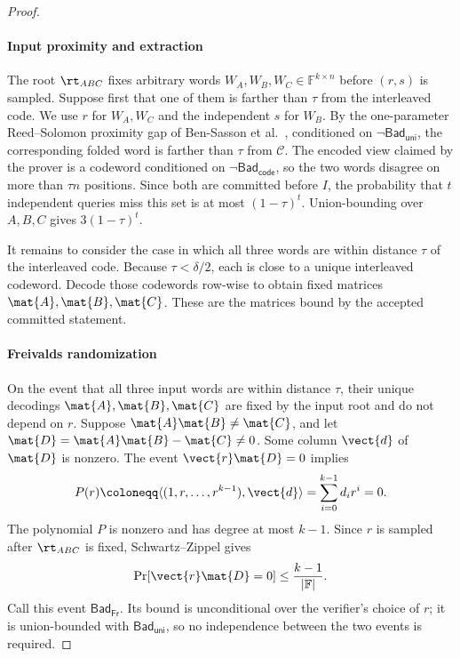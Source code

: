 \begin{proof}
\paragraph{Input proximity and extraction}
The root \(\rt_{ABC}\) fixes arbitrary words
\(W_A,W_B,W_C\in\mathbb{F}^{k\times n}\) before \((r,s)\) is sampled.
Suppose first that one of them is farther than \(\tau\) from the interleaved
code.  We use \(r\) for \(W_A,W_C\) and the independent \(s\) for \(W_B\).
By the one-parameter Reed--Solomon proximity gap of
Ben-Sasson et al.~\cite[Theorem~1.5]{bensasson2023proximity}, conditioned on
\(\neg\mathsf{Bad}_{\mathsf{uni}}\), the corresponding folded
word is farther than \(\tau\) from \(\mathcal{C}\).  The encoded view claimed
by the prover is a codeword conditioned on
\(\neg\mathsf{Bad}_{\mathsf{code}}\), so the two words disagree on more than
\(\tau n\) positions.  Since both are committed before \(I\), the probability
that \(t\) independent queries miss this set is at most \((1-\tau)^t\).
Union-bounding over \(A,B,C\) gives \(3(1-\tau)^t\).

It remains to consider the case in which all three words are within distance
\(\tau\) of the interleaved code.  Because \(\tau<\delta/2\), each is close
to a unique interleaved codeword.  Decode those codewords row-wise to obtain
fixed matrices \(\mat{A},\mat{B},\mat{C}\).  These are the matrices bound by
the accepted committed statement.

\paragraph{Freivalds randomization}
On the event that all three input words are within distance \(\tau\), their
unique decodings \(\mat{A},\mat{B},\mat{C}\) are fixed by the input root and
do not depend on \(r\).  Suppose \(\mat{A}\mat{B}\neq\mat{C}\), and let
\(\mat{D}=\mat{A}\mat{B}-\mat{C}\neq 0\).  Some column
\(\vect{d}\) of \(\mat{D}\) is nonzero.  The event
\(\vect{r}\mat{D}=0\) implies
\[
  P(r)
  \coloneqq
  \langle (1,r,\ldots,r^{k-1}),\vect{d}\rangle
  =
  \sum_{i=0}^{k-1} d_i r^i
  =
  0 .
\]
The polynomial \(P\) is nonzero and has degree at most \(k-1\).  Since \(r\)
is sampled after \(\rt_{ABC}\) is fixed, Schwartz--Zippel gives
\[
  \Pr[\vect{r}\mat{D}=0]
  \le
  \frac{k-1}{|\mathbb{F}|}.
\]
Call this event \(\mathsf{Bad}_{\mathsf{Fr}}\).  Its bound is unconditional
over the verifier's choice of \(r\); it is union-bounded with
\(\mathsf{Bad}_{\mathsf{uni}}\), so no independence between the two events is
required.


\end{proof}
